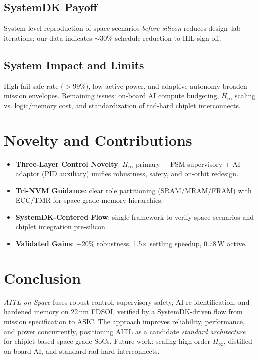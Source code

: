 \documentclass[conference]{IEEEtran}
\begin{document}
\subsection{SystemDK Payoff}
System-level reproduction of space scenarios \emph{before silicon} reduces design--lab
iterations; our data indicates $\sim$30\% schedule reduction to HIL sign-off.

\subsection{System Impact and Limits}
High fail-safe rate ($>\!99\%$), low active power, and adaptive autonomy broaden
mission envelopes. Remaining issues: on-board AI compute budgeting, $H_\infty$
scaling vs. logic/memory cost, and standardization of rad-hard chiplet interconnects.

\section*{Novelty and Contributions}
\begin{itemize}
  \item \textbf{Three-Layer Control Novelty}: $H_\infty$ primary + FSM supervisory + AI adaptor
  (PID auxiliary) unifies robustness, safety, and on-orbit redesign.
  \item \textbf{Tri-NVM Guidance}: clear role partitioning (SRAM/MRAM/FRAM) with ECC/TMR
  for space-grade memory hierarchies.
  \item \textbf{SystemDK-Centered Flow}: single framework to verify space scenarios and
  chiplet integration pre-silicon.
  \item \textbf{Validated Gains}: +20\% robustness, 1.5$\times$ settling speedup, 0.78\,W active.
\end{itemize}

\section*{Conclusion}
\emph{AITL on Space} fuses robust control, supervisory safety, AI re-identification,
and hardened memory on 22\,nm FDSOI, verified by a SystemDK-driven flow
from mission specification to ASIC. The approach improves reliability, performance,
and power concurrently, positioning AITL as a candidate \emph{standard architecture}
for chiplet-based space-grade SoCs. Future work: scaling high-order $H_\infty$,
distilled on-board AI, and standard rad-hard interconnects.

\FloatBarrier
\end{document}
